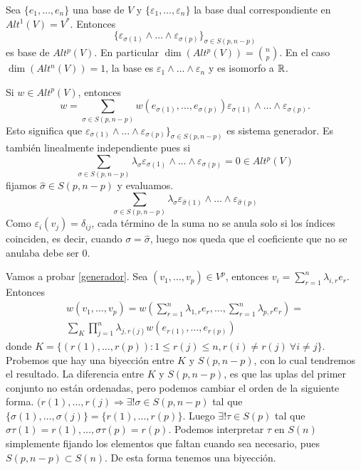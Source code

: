 \documentclass[CV.tex]{subfiles}
\begin{document}
\begin{teorema}
Sea $\{e_1,\dots, e_n\}$ una base de $V$ y $\{\varepsilon_1,\dots, \varepsilon_n\}$ la base dual correspondiente en $Alt^1(V)=V^*$. Entonces 
$$\{\varepsilon_{\sigma(1)}\land\dots\land\varepsilon_{\sigma(p)}\}_{\sigma\in S(p,n-p)}$$
es base de $Alt^p(V)$. En particular $\dim(Alt^p(V))=\binom{n}{p}$. En el caso $\dim(Alt^n(V))=1$, la base es $\varepsilon_1\land\dots\land\varepsilon_n$ y es isomorfo a $\mathbb{R}$.
\end{teorema}
\begin{dem}
Si $w\in Alt^p(V)$, entonces
\begin{equation}\label{generador}
w=\sum_{\sigma\in S(p,n-p)}w(e_{\sigma(1)},\dots,e_{\sigma(p)})\varepsilon_{\sigma(1)}\land\dots\land\varepsilon_{\sigma(p)}.
\end{equation}
Esto significa que $\varepsilon_{\sigma(1)}\land\dots\land\varepsilon_{\sigma(p)}\}_{\sigma\in S(p,n-p)}$ es sistema generador. Es también linealmente independiente pues si
$$\sum_{\sigma\in S(p,n-p)}\lambda_{\sigma}\varepsilon_{\sigma(1)}\land\dots\land\varepsilon_{\sigma(p)}=0\in Alt^p(V)$$
fijamos $\hat{\sigma}\in S(p,n-p)$ y evaluamos.
$$\sum_{\sigma\in S(p,n-p)}\lambda_{\sigma}\varepsilon_{\hat{\sigma}(1)}\land\dots\land\varepsilon_{\hat{\sigma}(p)}$$
 Como $\varepsilon_i(v_j)=\delta_{ij}$, cada término de la suma no se anula solo si los índices coinciden, es decir, cuando $\sigma=\hat{\sigma}$, luego nos queda que el coeficiente que no se anulaba debe ser 0.
 
Vamos a probar \ref{generador}. Sea $(v_1,\dots, v_p)\in V^p$, entonces $v_i=\sum_{r=1}^n\lambda_{i,r}e_r$. Entonces
\begin{gather*}
w(v_1,\dots, v_p)=w(\sum_{r=1}^n\lambda_{1,r}e_r,\dots, \sum_{r=1}^n\lambda_{p,r}e_r)=\\
\sum_K\prod_{j=1}^n\lambda_{j,r(j)}w(e_{r(1)},\dots, e_{r(p)})
\end{gather*}
donde $K=\{(r(1),\dots, r(p)):1\leq r(j)\leq n, r(i)\neq r(j)\ \forall i\neq j\}$. Probemos que hay una biyección entre $K$ y $S(p,n-p)$, con lo cual tendremos el resultado. La diferencia entre $K$ y $S(p,n-p)$, es que las uplas del primer conjunto no están ordenadas, pero podemos cambiar el orden de la siguiente forma. $(r(1),\dots, r(j)\Rightarrow\exists!\sigma\in S(p,n-p)$ tal que $\{\sigma(1),\dots, \sigma(j)\}=\{r(1),\dots, r(p)\}$. Luego $\exists!\tau\in S(p)$ tal que $\sigma\tau(1)=r(1),\dots, \sigma\tau(p)=r(p)$. Podemos interpretar $\tau$ en $S(n)$ simplemente fijando los elementos que faltan cuando sea necesario, pues $S(p,n-p)\subset S(n)$. De esta forma tenemos una biyección. 


\end{dem}
\end{document}
